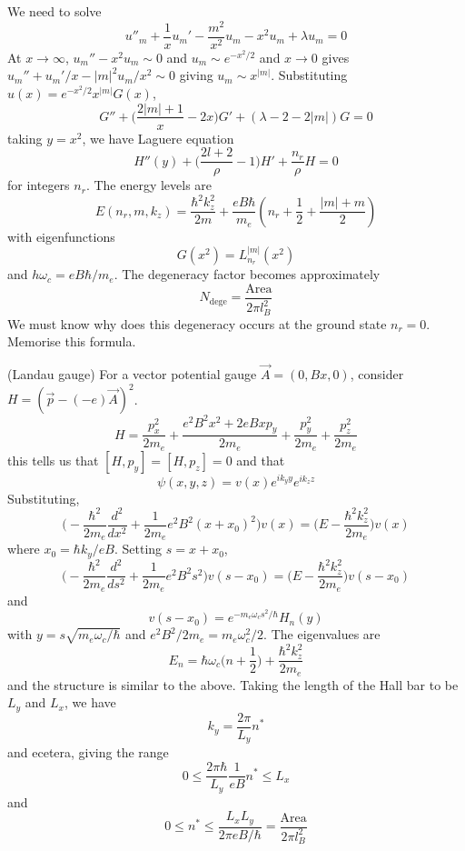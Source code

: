 \begin{thm}
We need to solve
\[u''_{m}+\dfrac{1}{x}u_{m}'-\dfrac{m^2}{x^2}u_{m}-x^2u_{m}+\lambda u_{m}=0\]
At $x\rightarrow \infty $, $u_{m}''-x^2u_{m}\sim 0$ and $u_{m}\sim e^{-x^2/2}$ and $x\rightarrow 0$ gives $u_{m}''+u_{m}'/x-|m|^2u_{m}/x^2\sim 0$ giving $u_{m}\sim x^{|m|}$. Substituting $u(x)=e^{-x^2/2}x^{|m|}G(x)$,
\[G''+\Big(\dfrac{2|m|+1}{x}-2x\Big)G'+(\lambda -2-2|m|)G=0\]
taking $y=x^2$, we have Laguere equation
\[H''(y)+\Big(\dfrac{2l+2}{\rho }-1\Big)H'+\dfrac{n_{r}}{\rho }H=0\]
for integers $n_{r}$. The energy levels are
\[E(n_{r},m,k_{z})=\dfrac{\hbar ^2k_{z}^2}{2m}+\dfrac{eB\hbar }{m_{e}}(n_{r}+\dfrac{1}{2}+\dfrac{|m|+m}{2})\]
with eigenfunctions 
\[G(x^2)=L^{|m|}_{n_{r}}(x^2)\]
and $h\omega _{c}=eB\hbar /m_{e}$. The degeneracy factor becomes approximately
\[N_{\mathrm{dege}}=\dfrac{\mathrm{Area}}{2\pi l_{B}^2}\]
We must know why does this degeneracy occurs at the ground state $n_{r}=0$. Memorise this formula.
\end{thm}
\vspace{2ex}
\begin{defi}
(Landau gauge) For a vector potential gauge $\vec{A}=(0,Bx,0)$, consider $H=(\vec{p}-(-e)\vec{A})^2$. 
\[H=\dfrac{p_{x}^2}{2m_{e}}+\dfrac{e^2B^2x^2+2eBxp_{y}}{2m_{e}}+\dfrac{p_{y}^2}{2m_{e}}+\dfrac{p_{z}^2}{2m_{e}}\]
this tells us that $[H,p_{y}]=[H,p_{z}]=0$ and that 
\[\psi (x,y,z)=v(x)e^{ik_{y}y}e^{ik_{z}z}\]
Substituting,
\[\Big(-\dfrac{\hbar ^2}{2m_{e}}\dfrac{d ^2}{d x^2}+\dfrac{1}{2m_{e}}e^2B^2(x+x_0)^2\Big)v(x)=\Big(E-\dfrac{\hbar ^2k_{z}^2}{2m_{e}}\Big)v(x)\]
where $x_0=\hbar k_{y}/eB$. Setting $s=x+x_0$,
\[\Big(-\dfrac{\hbar ^2}{2m_{e}}\dfrac{d ^2}{d s^2}+\dfrac{1}{2m_{e}}e^2B^2s^2\Big)v(s-x_0)=\Big(E-\dfrac{\hbar ^2k_{z}^2}{2m_{e}}\Big)v(s-x_0)\]
and 
\[v(s-x_0)=e^{-m_{e}\omega _{c}s^2/\hbar }H_{n}(y)\]
with $y=s\sqrt{m_{e}\omega _{c}/\hbar }$ and $e^2B^2/2m_{e}=m_{e}\omega _{c}^2/2$. The eigenvalues are
\[E_{n}=\hbar \omega _{c}\Big(n+\dfrac{1}{2}\Big)+\dfrac{\hbar ^2k_{z}^2}{2m_{e}}\]
and the structure is similar to the above. Taking the length of the Hall bar to be $L_{y}$ and $L_{x}$, we have
\[k_{y}=\dfrac{2\pi }{L_{y}}n^{*}\]
and ecetera, giving the range
\[0\leq \dfrac{2\pi \hbar }{L_{y}}\dfrac{1}{eB}n^{*}\leq L_{x}\]
and
\[0\leq n^{*}\leq \dfrac{L_{x}L_{y}}{2\pi eB/\hbar }=\dfrac{\mathrm{Area}}{2\pi l_{B}^2}\]
\end{defi}
\vspace{2ex}

